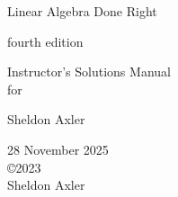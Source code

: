 \documentclass[leqno,10pt]{book}
\begin{document}
%












%


\begin{center}
{{\huge
\color{blue}Linear Algebra Done Right\par}

\bigskip

fourth edition

\bigskip

{\Large Instructor's Solutions Manual \\[8bp]for \instructor}}

\bigskip

\bigskip

\bigskip

\bigskip

{
{\huge \color{blue}Sheldon Axler
}

\vfill
28 November 2025\\
\copyright 2023\\
Sheldon Axler
}
\end{center}

\newpage

\thispagestyle{empty}
\end{document}
